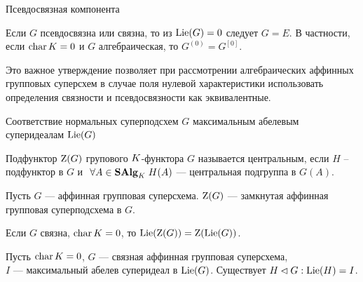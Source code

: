\begin{subsection}{Псевдосвязная компонента}
  \begin{lemma}
    Если $ G $ псевдосвязна или связна, то из $ \mathrm{Lie}(G) = 0 $ следует $ G = E $.
    В частности, если $ \mathop{\mathrm{char}}K = 0 $ и $ G $ алгебраическая, то $ G^{(0)} = G^{[0]} $.
  \end{lemma}

  Это важное утверждение позволяет при рассмотрении алгебраических
  аффинных групповых суперсхем в случае поля нулевой характеристики
  использовать определения связности и псевдосвязности как эквивалентные.

\end{subsection}


\begin{subsection}{Соответствие нормальных суперподсхем $ G $
                   максимальным абелевым суперидеалам $ \mathrm{Lie}(G) $ }
  \begin{definition}
    Подфунктор $ \mathrm{Z}(G) $ групового $ K $-функтора $ G $ называется центральным,
    если $ H $ -- подфунктор в $ G $ и $ ~\forall A \in \mathbf{SAlg}_K \; H(A) $ ---
    центральная подгруппа в $ G(A) $.
  \end{definition}

  \begin{proposition} \label{Z(G) closed in G}
    Пусть $ G $ --- аффинная групповая суперсхема.
    $ \mathrm{Z}(G) $ --- замкнутая аффинная групповая суперподсхема в $ G $.
  \end{proposition}

  \begin{lemma} \label{Lie(Z(G)) = Z(Lie(G))}
    Если $ G $ связна, $ \mathop{\mathrm{char}}K = 0 $, то $ \mathrm{Lie}(\mathrm{Z}(G)) = \mathrm{Z}(\mathrm{Lie}(G)) $.
  \end{lemma}

  \begin{theorem} \label{Exists H in G: Lie(H) = I}
    Пусть $ \mathop{\mathrm{char}}K = 0 $, $ G $ --- связная аффинная групповая суперсхема, \\
    $ I $ --- максимальный абелев суперидеал в $ \mathrm{Lie}(G) $.
    Существует $ H \lhd G : \mathrm{Lie}(H) = I $.
\end{theorem}
\end{subsection}
